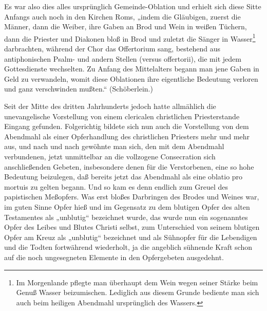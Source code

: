 Es war also dies alles ursprünglich Gemeinde-Oblation und erhielt sich diese Sitte Anfangs auch noch in den Kirchen Roms, „indem die Gläubigen, zuerst die Männer, dann die Weiber, ihre Gaben an Brod und Wein in weißen
Tüchern, dann die Priester und Diakonen bloß in Brod und zuletzt die Sänger in Wasser\footnote{Im Morgenlande pflegte man überhaupt dem Wein wegen seiner Stärke beim Genuß Wasser beizumischen. Lediglich aus diesem Grunde bediente man sich auch beim heiligen Abendmahl ursprünglich des Wassers.} darbrachten, während der Chor das Offertorium sang, bestehend aus antiphonischen Psalm- und andern Stellen (versus offertorii), die mit jedem Gottesdienste wechselten. Zu Anfang des Mittelalters begann man jene Gaben in Geld zu verwandeln, womit diese Oblationen ihre eigentliche Bedeutung verloren und ganz verschwinden mußten.“ (Schöberlein.)

Seit der Mitte des dritten Jahrhunderts jedoch hatte allmählich die unevangelische Vorstellung von einem clericalen christlichen Priesterstande Eingang gefunden. Folgerichtig bildete sich nun auch die Vorstellung von dem Abendmahl als einer Opferhandlung des christlichen Priesters mehr und mehr aus, und nach und nach gewöhnte man sich, den mit dem Abendmahl verbundenen, jetzt unmittelbar an die vollzogene Consecration sich anschließenden Gebeten, insbesondere denen für die Verstorbenen, eine so hohe Bedeutung beizulegen, daß bereits jetzt das Abendmahl als eine oblatio pro mortuis zu gelten begann. Und so kam es denn endlich zum Greuel des papistischen Meßopfers. Was erst bloßes Darbringen des Brodes und Weines war, im guten Sinne Opfer hieß und im Gegensatz zu dem blutigen Opfer des alten Testamentes als „unblutig“ bezeichnet wurde, das wurde nun ein sogenanntes Opfer des Leibes und Blutes Christi selbst, zum Unterschied von seinem blutigen Opfer am Kreuz als „unblutig“ bezeichnet und als Sühnopfer für die Lebendigen und die Todten fortwährend wiederholt, ja die angeblich sühnende Kraft schon auf die noch ungesegneten Elemente in den Opfergebeten ausgedehnt.

